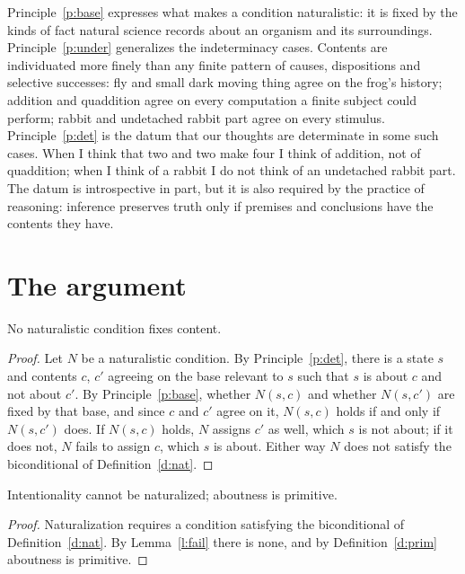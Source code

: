 \documentclass{situationist-preprint}
\begin{document}
Principle~\ref{p:base} expresses what makes a condition naturalistic: it is fixed by the kinds of fact natural science records about an organism and its surroundings. Principle~\ref{p:under} generalizes the indeterminacy cases. Contents are individuated more finely than any finite pattern of causes, dispositions and selective successes: fly and small dark moving thing agree on the frog's history; addition and quaddition agree on every computation a finite subject could perform; rabbit and undetached rabbit part agree on every stimulus. Principle~\ref{p:det} is the datum that our thoughts are determinate in some such cases. When I think that two and two make four I think of addition, not of quaddition; when I think of a rabbit I do not think of an undetached rabbit part. The datum is introspective in part, but it is also required by the practice of reasoning: inference preserves truth only if premises and conclusions have the contents they have.

\section{The argument}

\begin{lemma}\label{l:fail}
No naturalistic condition fixes content.
\end{lemma}

\begin{proof}
Let $N$ be a naturalistic condition. By Principle~\ref{p:det}, there is a state $s$ and contents $c$, $c'$ agreeing on the base relevant to $s$ such that $s$ is about $c$ and not about $c'$. By Principle~\ref{p:base}, whether $N(s,c)$ and whether $N(s,c')$ are fixed by that base, and since $c$ and $c'$ agree on it, $N(s,c)$ holds if and only if $N(s,c')$ does. If $N(s,c)$ holds, $N$ assigns $c'$ as well, which $s$ is not about; if it does not, $N$ fails to assign $c$, which $s$ is about. Either way $N$ does not satisfy the biconditional of Definition~\ref{d:nat}.
\end{proof}

\begin{theorem}\label{t:prim}
Intentionality cannot be naturalized; aboutness is primitive.
\end{theorem}

\begin{proof}
Naturalization requires a condition satisfying the biconditional of Definition~\ref{d:nat}. By Lemma~\ref{l:fail} there is none, and by Definition~\ref{d:prim} aboutness is primitive.
\end{proof}
\end{document}
